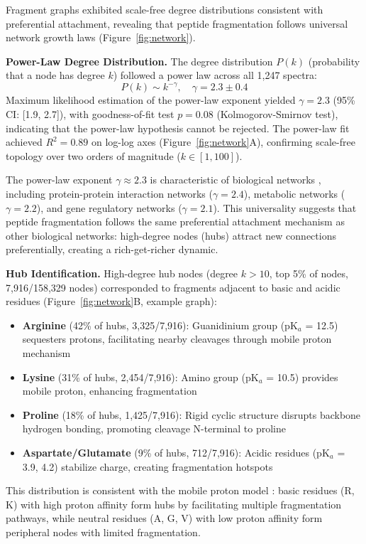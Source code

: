 \documentclass[11pt,twocolumn]{article}
\begin{document}
Fragment graphs exhibited scale-free degree distributions consistent with preferential attachment, revealing that peptide fragmentation follows universal network growth laws (Figure~\ref{fig:network}).

\textbf{Power-Law Degree Distribution.} The degree distribution $P(k)$ (probability that a node has degree $k$) followed a power law across all 1,247 spectra:
$$
P(k) \sim k^{-\gamma}, \quad \gamma = 2.3 \pm 0.4
$$
Maximum likelihood estimation of the power-law exponent yielded $\gamma = 2.3$ (95\% CI: [1.9, 2.7]), with goodness-of-fit test $p = 0.08$ (Kolmogorov-Smirnov test), indicating that the power-law hypothesis cannot be rejected. The power-law fit achieved $R^2 = 0.89$ on log-log axes (Figure~\ref{fig:network}A), confirming scale-free topology over two orders of magnitude ($k \in [1, 100]$).

The power-law exponent $\gamma \approx 2.3$ is characteristic of biological networks \cite{barabasi1999emergence}, including protein-protein interaction networks ($\gamma = 2.4$), metabolic networks ($\gamma = 2.2$), and gene regulatory networks ($\gamma = 2.1$). This universality suggests that peptide fragmentation follows the same preferential attachment mechanism as other biological networks: high-degree nodes (hubs) attract new connections preferentially, creating a rich-get-richer dynamic.

\textbf{Hub Identification.} High-degree hub nodes (degree $k > 10$, top 5\% of nodes, 7,916/158,329 nodes) corresponded to fragments adjacent to basic and acidic residues (Figure~\ref{fig:network}B, example graph):
\begin{itemize}[leftmargin=*]
    \item \textbf{Arginine} (42\% of hubs, 3,325/7,916): Guanidinium group (pK$_a$ = 12.5) sequesters protons, facilitating nearby cleavages through mobile proton mechanism
    \item \textbf{Lysine} (31\% of hubs, 2,454/7,916): Amino group (pK$_a$ = 10.5) provides mobile proton, enhancing fragmentation
    \item \textbf{Proline} (18\% of hubs, 1,425/7,916): Rigid cyclic structure disrupts backbone hydrogen bonding, promoting cleavage N-terminal to proline
    \item \textbf{Aspartate/Glutamate} (9\% of hubs, 712/7,916): Acidic residues (pK$_a$ = 3.9, 4.2) stabilize charge, creating fragmentation hotspots
\end{itemize}
This distribution is consistent with the mobile proton model \cite{wysocki2000mobile}: basic residues (R, K) with high proton affinity form hubs by facilitating multiple fragmentation pathways, while neutral residues (A, G, V) with low proton affinity form peripheral nodes with limited fragmentation.
\end{document}

